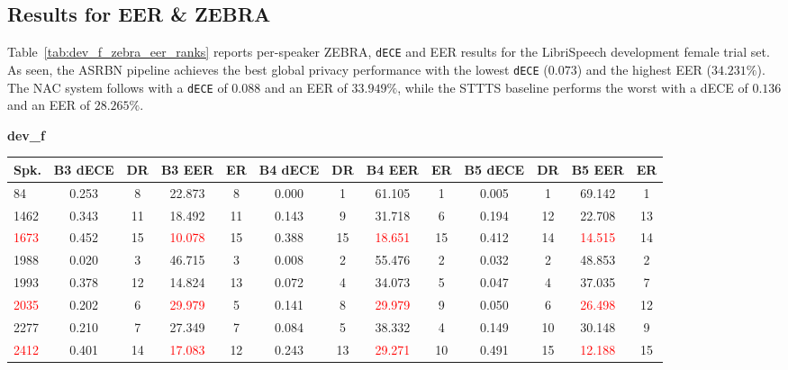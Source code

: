 \documentclass[12pt,leqno,a4paper]{article}
\begin{document}
\subsection{Results for EER \& ZEBRA}
\label{subsec:results_for_eer_and_zebra}

Table~\ref{tab:dev_f_zebra_eer_ranks} reports per-speaker ZEBRA, \texttt{dECE} 
and EER results for the LibriSpeech development female trial set. As seen, the ASRBN pipeline achieves the best global privacy performance with the lowest \texttt{dECE} ($0.073$) and the highest EER ($34.231\%$). The NAC system follows with a \texttt{dECE} of $0.088$ and an EER of $33.949\%$, while the STTTS baseline performs the worst with a dECE of $0.136$ and an EER of $28.265\%$. 

\begin{table}[H]
\centering
\textbf{dev\_f}\\[2pt]
\scriptsize
\setlength{\tabcolsep}{3pt}
\begin{tabular}{lcccccccccccc}
\toprule
\textbf{Spk.}
& \textbf{B3 dECE} & \textbf{DR} & \textbf{B3 EER} & \textbf{ER}
& \textbf{B4 dECE} & \textbf{DR} & \textbf{B4 EER} & \textbf{ER}
& \textbf{B5 dECE} & \textbf{DR} & \textbf{B5 EER} & \textbf{ER} \\
\midrule
84   & 0.253 & 8  & 22.873 & 8  & 0.000 & 1  & 61.105 & 1  
     & 0.005 & 1  & 69.142 & 1  \\
1462 & 0.343 & 11 & 18.492 & 11 & 0.143 & 9  & 31.718 & 6  
     & 0.194 & 12 & 22.708 & 13 \\
\textcolor{red}{1673} 
     & 0.452 & 15 & \textcolor{red}{10.078} & 15 
     & 0.388 & 15 & \textcolor{red}{18.651} & 15 
     & 0.412 & 14 & \textcolor{red}{14.515} & 14 \\
1988 & 0.020 & 3  & 46.715 & 3  & 0.008 & 2  & 55.476 & 2  
     & 0.032 & 2  & 48.853 & 2  \\
1993 & 0.378 & 12 & 14.824 & 13 & 0.072 & 4  & 34.073 & 5  
     & 0.047 & 4  & 37.035 & 7  \\
\textcolor{red}{2035} 
     & 0.202 & 6  & \textcolor{red}{29.979} & 5  
     & 0.141 & 8  & \textcolor{red}{29.979} & 9  
     & 0.050 & 6  & \textcolor{red}{26.498} & 12 \\
2277 & 0.210 & 7  & 27.349 & 7  & 0.084 & 5  & 38.332 & 4  
     & 0.149 & 10 & 30.148 & 9  \\
\textcolor{red}{2412} 
     & 0.401 & 14 & \textcolor{red}{17.083} & 12 
     & 0.243 & 13 & \textcolor{red}{29.271} & 10 
     & 0.491 & 15 & \textcolor{red}{12.188} & 15 \\

\end{tabular}
\end{table}
\end{document}

